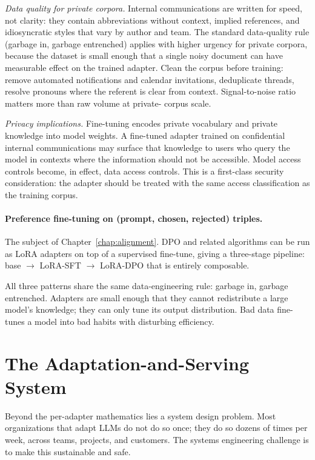 \emph{Data quality for private corpora.} Internal communications
are written for speed, not clarity: they contain abbreviations
without context, implied references, and idiosyncratic styles
that vary by author and team. The standard data-quality rule
(garbage in, garbage entrenched) applies with higher urgency for
private corpora, because the dataset is small enough that a
single noisy document can have measurable effect on the trained
adapter. Clean the corpus before training: remove automated
notifications and calendar invitations, deduplicate threads,
resolve pronouns where the referent is clear from context.
Signal-to-noise ratio matters more than raw volume at private-
corpus scale.

\emph{Privacy implications.} Fine-tuning encodes private
vocabulary and private knowledge into model weights. A fine-tuned
adapter trained on confidential internal communications may
surface that knowledge to users who query the model in contexts
where the information should not be accessible. Model access
controls become, in effect, data access controls. This is a
first-class security consideration: the adapter should be treated
with the same access classification as the training corpus.

\paragraph{Preference fine-tuning on (prompt, chosen, rejected)
triples.} The subject of Chapter~\ref{chap:alignment}. DPO \citep{rafailov2023direct} and
related algorithms can be run as LoRA adapters on top of a
supervised fine-tune, giving a three-stage pipeline: base $\to$
LoRA-SFT $\to$ LoRA-DPO that is entirely composable.

All three patterns share the same data-engineering rule: garbage in,
garbage entrenched. Adapters are small enough that they cannot
redistribute a large model's knowledge; they can only tune its
output distribution. Bad data fine-tunes a model into bad habits
with disturbing efficiency.

\section{The Adaptation-and-Serving System}

Beyond the per-adapter mathematics lies a system design problem.
Most organizations that adapt LLMs do not do so once; they do so
dozens of times per week, across teams, projects, and customers. The
systems engineering challenge is to make this sustainable and safe.

